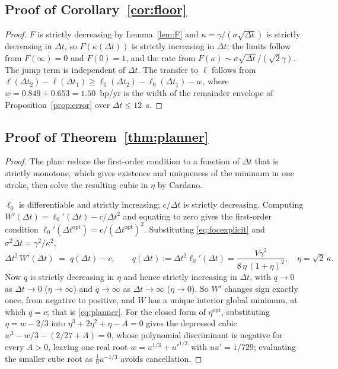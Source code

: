 \documentclass[runningheads]{llncs}
\newcommand{\dt}{\Delta t}
\newcommand{\1}{\mathbf{1}}
\begin{document}
\subsection{Proof of Corollary~\ref{cor:floor}}\label{app:corfloor}

\begin{proof}
$F$ is strictly decreasing by Lemma~\ref{lem:F} and $\kappa = \gamma/(\sigma\sqrt{\dt})$ is strictly decreasing in $\dt$, so $F(\kappa(\dt))$ is strictly increasing in $\dt$; the limits follow from $F(\infty)=0$ and $F(0)=1$, and the rate from $F(\kappa)\sim\sigma\sqrt{\dt}/(\sqrt2\gamma)$. The jump term is independent of $\dt$. The transfer to $\ell$ follows from $\ell(\dt_2)-\ell(\dt_1) \ge \ell_0(\dt_2)-\ell_0(\dt_1) - w$, where $w = 0.849+0.653 = 1.50$~bp/yr is the width of the remainder envelope of Proposition~\ref{prop:error} over $\dt\le12$~s.
\end{proof}

\subsection{Proof of Theorem~\ref{thm:planner}}\label{app:planner}

\begin{proof}
The plan: reduce the first-order condition to a function of $\dt$ that is strictly monotone, which gives existence and uniqueness of the minimum in one stroke, then solve the resulting cubic in $\eta$ by Cardano.

$\ell_0$ is differentiable and strictly increasing; $c/\dt$ is strictly decreasing. Computing $W'(\dt) = \ell_0'(\dt) - c/\dt^2$ and equating to zero gives the first-order condition $\ell_0'(\dt^{\mathrm{opt}}) = c/(\dt^{\mathrm{opt}})^2$. Substituting \eqref{eq:focexplicit} and $\sigma^2\dt = \gamma^2/\kappa^2$,
\[
\dt^2\,W'(\dt) \;=\; q(\dt) - c, \qquad q(\dt) := \dt^2\ell_0'(\dt) = \frac{V\gamma^2}{8\,\eta\,(1+\eta)^2},\quad \eta = \sqrt2\,\kappa .
\]
Now $q$ is strictly decreasing in $\eta$ and hence strictly increasing in $\dt$, with $q\to0$ as $\dt\to0$ ($\eta\to\infty$) and $q\to\infty$ as $\dt\to\infty$ ($\eta\to0$). So $W'$ changes sign exactly once, from negative to positive, and $W$ has a unique interior global minimum, at which $q = c$; that is \eqref{eq:planner}. For the closed form of $\eta^{\mathrm{opt}}$, substituting $\eta = w-2/3$ into $\eta^3+2\eta^2+\eta-A=0$ gives the depressed cubic $w^3-w/3-(2/27+A)=0$, whose polynomial discriminant is negative for every $A>0$, leaving one real root $w = u^{1/3}+u'^{1/3}$ with $uu'=1/729$; evaluating the smaller cube root as $\tfrac19u^{-1/3}$ avoids cancellation.
\end{proof}
\end{document}
